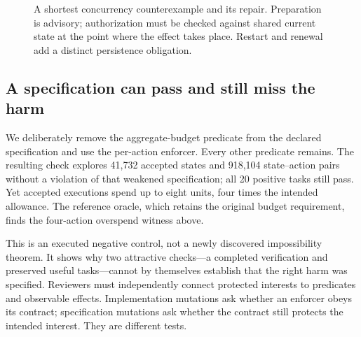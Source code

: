 \documentclass[10pt,twocolumn,letterpaper]{article}
\begin{document}
\begin{figure}[t]
\centering
{}
\caption{A shortest concurrency counterexample and its repair. Preparation is advisory; authorization must be checked against shared current state at the point where the effect takes place. Restart and renewal add a distinct persistence obligation.}
\label{fig:trace}
\end{figure}

\subsection{A specification can pass and still miss the harm}
\label{sec:omission}
We deliberately remove the aggregate-budget predicate from the declared specification and use the per-action enforcer. Every other predicate remains. The resulting check explores 41,732 accepted states and 918,104 state--action pairs without a violation of that weakened specification; all 20 positive tasks still pass. Yet accepted executions spend up to eight units, four times the intended allowance. The reference oracle, which retains the original budget requirement, finds the four-action overspend witness above.

This is an executed negative control, not a newly discovered impossibility theorem. It shows why two attractive checks---a completed verification and preserved useful tasks---cannot by themselves establish that the right harm was specified. Reviewers must independently connect protected interests to predicates and observable effects. Implementation mutations ask whether an enforcer obeys its contract; specification mutations ask whether the contract still protects the intended interest. They are different tests.
\end{document}
